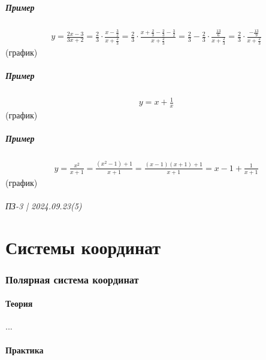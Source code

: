 \documentclass{article}
\begin{document}
\subsubsection{Пример}
\begin{gather*}
    y = \frac{2x - 3}{3x + 2} = \frac{2}{3} \cdot \frac{x - \frac{3}{2}}{x + \frac{2}{3}} =
    \frac{2}{3} \cdot \frac{x + \frac{2}{3} - \frac{2}{3} - \frac{3}{2}}{x + \frac{2}{3}} =
    \frac{2}{3} - \frac{2}{3} \cdot \frac{\frac{13}{6}}{x + \frac{2}{3}} =
    \frac{2}{3} \cdot \frac{-\frac{13}{9}}{x + \frac{2}{3}}
\end{gather*}
(график)

\subsubsection{Пример}
\begin{gather*}
    y = x + \frac{1}{x}
\end{gather*}
(график)

\subsubsection{Пример}
\begin{gather*}
    y = \frac{x^2}{x + 1} = \frac{(x^2 - 1) + 1}{x + 1} = \frac{(x - 1)(x + 1) + 1}{x + 1} = x - 1 + \frac{1}{x + 1}
\end{gather*}
(график)




\newpage
\paragraph{ПЗ-3 | 2024.09.23(5)}
\part{Системы координат}

\section{Полярная система координат}

\subsection{Теория}
...


\subsection{Практика}
\end{document}
